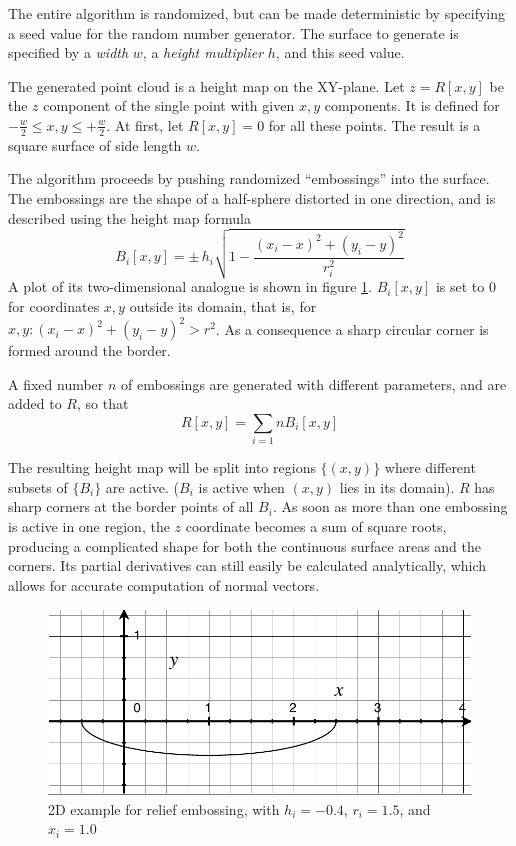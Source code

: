 The entire algorithm is randomized, but can be made deterministic by specifying a seed value for the random number generator. The surface to generate is specified by a \emph{width} $w$, a \emph{height multiplier} $h$, and this seed value.

The generated point cloud is a height map on the XY-plane. Let $z = R[x,y]$ be the $z$ component of the single point with given $x, y$ components. It is defined for $-\frac{w}{2} \leq x,y \leq +\frac{w}{2}$. At first, let $R[x,y] = 0$ for all these points. The result is a square surface of side length $w$.

The algorithm proceeds by pushing randomized ``embossings'' into the surface. The embossings are the shape of a half-sphere distorted in one direction, and is described using the height map formula
\begin{equation}
B_i[x,y] = \pm \, h_i \sqrt{1 - \frac{(x_i - x)^2 + (y_i - y)^2}{r_i^2}}
\end{equation}
A plot of its two-dimensional analogue is shown in figure \ref{fig:relief_B}. $B_i[x,y]$ is set to $0$ for coordinates $x,y$ outside its domain, that is, for $x,y : (x_i - x)^2 + (y_i - y)^2 > r^2$. As a consequence a sharp circular corner is formed around the border.

A fixed number $n$ of embossings are generated with different parameters, and are added to $R$, so that
\begin{equation}
R[x,y] = \sum_{i=1}{n} B_i[x,y]
\end{equation}

The resulting height map will be split into regions $\{(x,y)\}$ where different subsets of $\{B_i\}$ are active. ($B_i$ is active when $(x,y)$ lies in its domain). $R$ has sharp corners at the border points of all $B_i$. As soon as more than one embossing is active in one region, the $z$ coordinate becomes a sum of square roots, producing a complicated shape for both the continuous surface areas and the corners. Its partial derivatives can still easily be calculated analytically, which allows for accurate computation of normal vectors. 

\begin{figure}[h]
\centering
\includegraphics[width=.5\textwidth]{fig/relief_B.pdf}
\caption{2D example for relief embossing, with $h_i = -0.4$, $r_i = 1.5$, and $x_i = 1.0$}
\label{fig:relief_B}
\end{figure}


